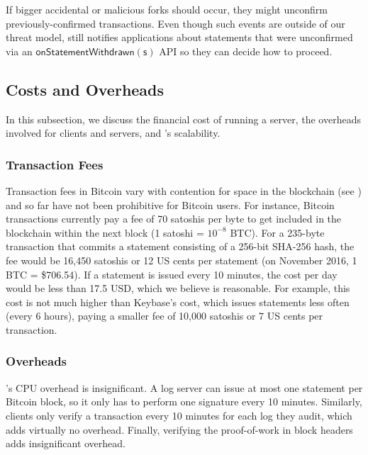 If bigger accidental or malicious forks should occur, they might unconfirm previously-confirmed \Sys transactions.
Even though such events are outside of our threat model, \Sys still notifies applications about statements that were unconfirmed via an $\mathsf{onStatementWithdrawn(s)}$ API so they can decide how to proceed.

\subsection{Costs and Overheads}

In this subsection, we discuss the financial cost of running a \Sys server, the overheads involved for clients and servers, and \Sys's scalability.

\subsubsection{Transaction Fees}
\label{sec:prototype:fees}
Transaction fees in Bitcoin vary with contention for space in the blockchain (see ) and so far have not been prohibitive for Bitcoin users.
For instance, Bitcoin transactions currently pay a fee of 70 satoshis per byte to get included in the blockchain within the next block\cite{bitcoin-fees-21co} (1 satoshi = $10^{-8}$ BTC).
For a 235-byte \Sys transaction that commits a statement consisting of a 256-bit SHA-256 hash, the fee would be 16,450 satoshis or 12 US cents per statement (on November 2016, 1 BTC = \$706.54).
If a statement is issued every 10 minutes, the cost per day would be less than 17.5 USD, which we believe is reasonable.
For example, this cost is not much higher than Keybase's cost\cite{keybase}, which issues statements less often (every 6 hours), paying a smaller fee of 10,000 satoshis or 7 US cents per transaction\cite{keybase-txs}.

\subsubsection{Overheads}
\label{sec:prototype:overheads}
\Sys's CPU overhead is insignificant.
A \Sys log server can issue at most one statement per Bitcoin block, so it only has to perform one signature every 10 minutes.
Similarly, \Sys clients only verify a transaction every 10 minutes for each log they audit, which adds virtually no overhead.
Finally, verifying the proof-of-work in block headers adds insignificant overhead.

